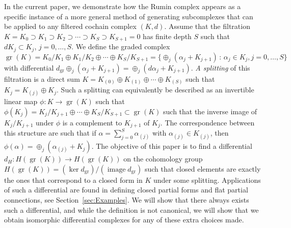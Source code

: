 \documentclass[10pt]{amsart}
\theoremstyle{remark}
\DeclareMathOperator{\image}{image}
\DeclareMathOperator{\gr}{gr}
\numberwithin{equation}{section}
\begin{document}
In the current paper, we demonstrate how the Rumin complex appears as a specific instance of a more general method of generating subcomplexes that can be applied to any filtered cochain complex $(K,d)$. Assume that the filtration $K= K_0 \supset K_1 \supset K_2 \supset \cdots \supset K_S \supset K_{S+1} =0$ has finite depth $S$ such that $dK_j \subset K_j$, $j =0, \dots, S$. We define the graded complex
\begin{equation} \label{DefGr}
\gr(K) = K_0/K_1 \oplus K_1 /K_2 \oplus \cdots \oplus K_S/K_{S+1} = \{ \oplus_j(\alpha_j + K_{j+1}) \, :\, \alpha_j \in K_j, j=0, \dots, S \}
\end{equation}
with differential $d_{\gr} \oplus_j (\alpha_j + K_{j+1}) = \oplus_j (d\alpha_j + K_{j+1})$. \emph{A splitting} of this filtration is a direct sum $K = K_{(0)} \oplus K_{(1)} \oplus \cdots \oplus K_{(S)}$ such that $K_{j} = K_{(j)} \oplus K_j$. Such a splitting can equivalently be described as an invertible linear map $\phi: K \to \gr(K)$ such that $\phi(K_j) = K_j/K_{j+1} \oplus \cdots \oplus K_S/K_{S+1} \subset \gr(K)$ such that the inverse image of $K_j/K_{j+1}$ under $\phi$ is a complement to $K_{j+1}$ of $K_j$. The correspondence between this structure are such that if $\alpha = \sum_{j=0}^S \alpha_{(j)}$ with $\alpha_{(j)} \in K_{(j)}$, then $\phi(\alpha) = \oplus_j (\alpha_{(j)}+K_j)$.
The objective of this paper is to find a differential $d_H: H(\gr(K))  \to H(\gr(K))$ on the cohomology group $H(\gr(K)) =(\ker d_{\gr})/(\image d_{\gr})$ such that closed elements are exactly the ones that correspond to a closed form in $K$ under some splitting. Applications of such a differential are found in defining closed partial forms and flat partial connections, see Section~\ref{sec:Examples}. We will show that there always exists such a differential, and while the definition is not canonical, we will show that we obtain isomorphic differential complexes for any of these extra choices made.
\end{document}
